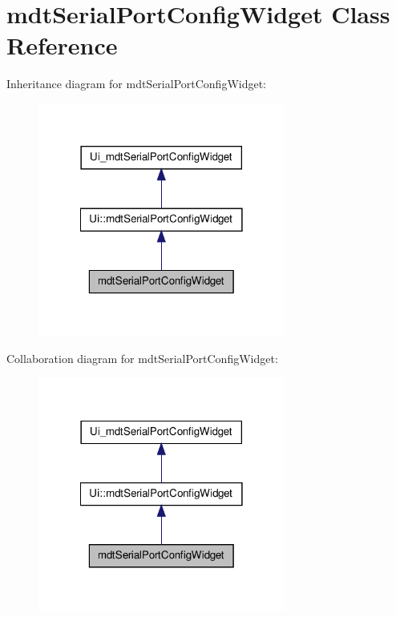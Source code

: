 \hypertarget{classmdt_serial_port_config_widget}{
\section{mdtSerialPortConfigWidget Class Reference}
\label{classmdt_serial_port_config_widget}
}


Inheritance diagram for mdtSerialPortConfigWidget:\nopagebreak
\begin{figure}[H]
\begin{center}
\leavevmode
\includegraphics[width=230pt]{classmdt_serial_port_config_widget__inherit__graph}
\end{center}
\end{figure}


Collaboration diagram for mdtSerialPortConfigWidget:\nopagebreak
\begin{figure}[H]
\begin{center}
\leavevmode
\includegraphics[width=230pt]{classmdt_serial_port_config_widget__coll__graph}
\end{center}
\end{figure}
